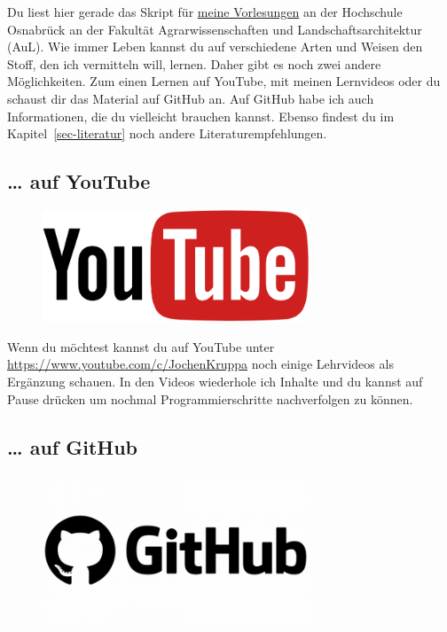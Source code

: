 \documentclass[
  letterpaper,
  DIV=11,
  oneside]{scrreport}
\begin{document}
Du liest hier gerade das Skript für
\protect\hyperlink{sec-vorlesungen-hs}{meine Vorlesungen} an der
Hochschule Osnabrück an der Fakultät Agrarwissenschaften und
Landschaftsarchitektur (AuL). Wie immer Leben kannst du auf verschiedene
Arten und Weisen den Stoff, den ich vermitteln will, lernen. Daher gibt
es noch zwei andere Möglichkeiten. Zum einen Lernen auf YouTube, mit
meinen Lernvideos oder du schaust dir das Material auf GitHub an. Auf
GitHub habe ich auch Informationen, die du vielleicht brauchen kannst.
Ebenso findest du im Kapitel~\ref{sec-literatur} noch andere
Literaturempfehlungen.

\hypertarget{auf-youtube}{%
\subsection*{\ldots{} auf YouTube}\label{auf-youtube}}

\begin{figure}

{\centering \includegraphics[width=3.125in,height=\textheight]{./images/youtube.png}

}

\end{figure}

Wenn du möchtest kannst du auf YouTube unter
\url{https://www.youtube.com/c/JochenKruppa} noch einige Lehrvideos als
Ergänzung schauen. In den Videos wiederhole ich Inhalte und du kannst
auf Pause drücken um nochmal Programmierschritte nachverfolgen zu
können.

\hypertarget{auf-github}{%
\subsection*{\ldots{} auf GitHub}\label{auf-github}}

\begin{figure}

{\centering \includegraphics[width=3.125in,height=\textheight]{./images/github.png}

}

\end{figure}
\end{document}
